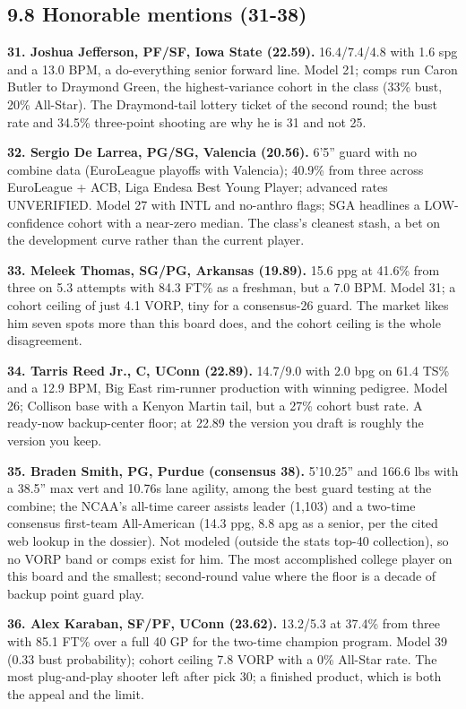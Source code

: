 \documentclass[
  10pt,
]{article}
\begin{document}
\subsection{9.8 Honorable mentions (31-38)}\label{honorable-mentions-31-38}

\textbf{31. Joshua Jefferson, PF/SF, Iowa State (22.59).} 16.4/7.4/4.8 with 1.6
spg and a 13.0 BPM, a do-everything senior forward line. Model 21; comps run
Caron Butler to Draymond Green, the highest-variance cohort in the class (33\%
bust, 20\% All-Star). The Draymond-tail lottery ticket of the second round; the
bust rate and 34.5\% three-point shooting are why he is 31 and not 25.

\textbf{32. Sergio De Larrea, PG/SG, Valencia (20.56).} 6'5'' guard with no
combine data (EuroLeague playoffs with Valencia); 40.9\% from three across
EuroLeague + ACB, Liga Endesa Best Young Player; advanced rates UNVERIFIED.
Model 27 with INTL and no-anthro flags; SGA headlines a LOW-confidence cohort
with a near-zero median. The class's cleanest stash, a bet on the development
curve rather than the current player.

\textbf{33. Meleek Thomas, SG/PG, Arkansas (19.89).} 15.6 ppg at 41.6\% from
three on 5.3 attempts with 84.3 FT\% as a freshman, but a 7.0 BPM. Model 31; a
cohort ceiling of just 4.1 VORP, tiny for a consensus-26 guard. The market likes
him seven spots more than this board does, and the cohort ceiling is the whole
disagreement.

\textbf{34. Tarris Reed Jr., C, UConn (22.89).} 14.7/9.0 with 2.0 bpg on 61.4
TS\% and a 12.9 BPM, Big East rim-runner production with winning pedigree. Model
26; Collison base with a Kenyon Martin tail, but a 27\% cohort bust rate. A
ready-now backup-center floor; at 22.89 the version you draft is roughly the
version you keep.

\textbf{35. Braden Smith, PG, Purdue (consensus 38).} 5'10.25'' and 166.6 lbs
with a 38.5'' max vert and 10.76s lane agility, among the best guard testing at
the combine; the NCAA's all-time career assists leader (1,103) and a two-time
consensus first-team All-American (14.3 ppg, 8.8 apg as a senior, per the cited
web lookup in the dossier). Not modeled (outside the stats top-40 collection),
so no VORP band or comps exist for him. The most accomplished college player on
this board and the smallest; second-round value where the floor is a decade of
backup point guard play.

\textbf{36. Alex Karaban, SF/PF, UConn (23.62).} 13.2/5.3 at 37.4\% from three
with 85.1 FT\% over a full 40 GP for the two-time champion program. Model 39
(0.33 bust probability); cohort ceiling 7.8 VORP with a 0\% All-Star rate. The
most plug-and-play shooter left after pick 30; a finished product, which is both
the appeal and the limit.
\end{document}
